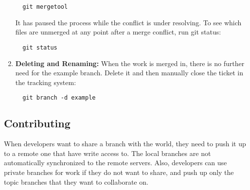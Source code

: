 \documentclass[draftclsnofoot,journal,onecolumn,12pt]{IEEEtran}
\begin{document}
\begin{enumerate}
\begin{verbatim}
  git mergetool
\end{verbatim}
It has paused the process while the conflict is under resolving. To see which files are unmerged at any point after a merge conflict, run git status:
\begin{verbatim}
  git status
\end{verbatim}
\item \textbf{Deleting and Renaming:} When the work is merged in, there is no further need for the example branch. Delete it and then manually close the ticket in the tracking system:
\begin{verbatim}
  git branch -d example
\end{verbatim}
\end{enumerate}

%
%
%
%  
\subsection{Contributing}
When developers want to share a branch with the world, they need to push it up to a remote one that have write access to. The local branches are not automatically synchronized to the remote servers. Also, developers can use private branches for work if they do not want to share, and push up only the topic branches that they want to collaborate on.
\end{document}
